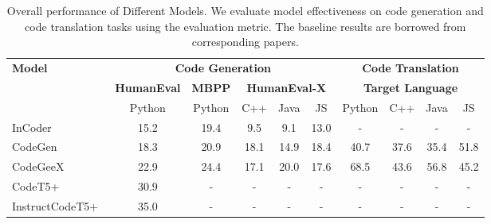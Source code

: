 \documentclass[11pt]{article}
\begin{document}
\begin{table*}[h]
\centering
\small
\caption{Overall performance of Different Models. We evaluate model effectiveness on code generation and code translation tasks using the  evaluation metric. The baseline results are borrowed from corresponding papers.}
\label{tab:overall_code_gen}
\begin{tabular}{l|ccccc|cccc}
\hline
\multirow{3}{*}{\textbf{Model}} & \multicolumn{5}{c|}{\textbf{Code Generation}}                                                                                & \multicolumn{4}{c}{\textbf{Code Translation}}                 \\ \cline{2-10} 
                                & \multicolumn{1}{c|}{\textbf{HumanEval}} & \multicolumn{1}{c|}{\textbf{MBPP}} & \multicolumn{3}{c|}{\textbf{HumanEval-X}}     & \multicolumn{4}{c}{\textbf{Target Language}}                  \\
                                & \multicolumn{1}{c|}{Python}             & \multicolumn{1}{c|}{Python}        & C++           & Java          & JS            & Python        & C++           & Java          & JS            \\ \hline
InCoder~\cite{fried2022incoder}                         & \multicolumn{1}{c|}{15.2}               & \multicolumn{1}{c|}{19.4}          & 9.5           & 9.1           & 13.0          & -             & -             & -             & -             \\
CodeGen~\cite{nijkamp2022codegen}                         & \multicolumn{1}{c|}{18.3}               & \multicolumn{1}{c|}{20.9}          & 18.1          & 14.9          & 18.4          & 40.7          & 37.6          & 35.4          & 51.8         \\
CodeGeeX~\cite{zheng2023codegeex}                        & \multicolumn{1}{c|}{22.9}               & \multicolumn{1}{c|}{24.4}          & 17.1          & 20.0          & 17.6          & 68.5 & 43.6          &56.8          &45.2         \\
CodeT5+~\cite{wang2023codet5+}                         & \multicolumn{1}{c|}{30.9}               & \multicolumn{1}{c|}{-}             & -             & -             & -             & -             & -             & -             & -             \\
InstructCodeT5+~\cite{wang2023codet5+}                 & \multicolumn{1}{c|}{35.0}               & \multicolumn{1}{c|}{-}             & -             & -             & -             & -             & -             & -             & -             \\

\end{tabular}
\end{table*}
\end{document}
